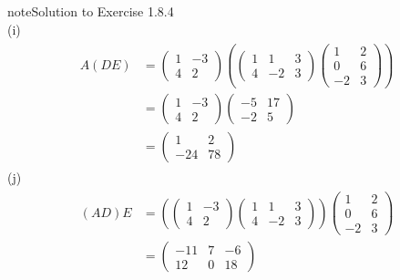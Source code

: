 \documentclass[letterpaper,10pt,english]{jupyterBook}
\begin{document}
\begin{sphinxadmonition}{note}{Solution to Exercise 1.8.4}
\begin{equation*}
\end{equation*}
\sphinxAtStartPar
(i)  
\begin{equation*}
\begin{split} \begin{align*}
    A(DE) &= \begin{pmatrix} 1 & -3 \\ 4 & 2 \end{pmatrix} \left(
    \begin{pmatrix} 1 & 1 & 3 \\ 4 & -2 & 3 \end{pmatrix} 
    \begin{pmatrix} 1 & 2 \\ 0 & 6 \\ -2 & 3 \end{pmatrix} \right) \\
    &= \begin{pmatrix} 1 & -3 \\ 4 & 2 \end{pmatrix}
    \begin{pmatrix} -5 & 17 \\ -2 & 5 \end{pmatrix} \\
    &= \begin{pmatrix} 1 & 2 \\ -24 & 78 \end{pmatrix}
\end{align*} \end{split}
\end{equation*}
\sphinxAtStartPar
(j)  
\begin{equation*}
\begin{split} \begin{align*}
    (AD)E &= \left(
    \begin{pmatrix} 1 & -3 \\ 4 & 2 \end{pmatrix}
    \begin{pmatrix} 1 & 1 & 3 \\ 4 & -2 & 3 \end{pmatrix}
    \right)
    \begin{pmatrix} 1 & 2 \\ 0 & 6 \\ -2 & 3 \end{pmatrix} \\
    &= \begin{pmatrix} -11 & 7 & -6 \\ 12 & 0 & 18 \end{pmatrix}

\end{align*}
\end{split}
\end{equation*}
\end{sphinxadmonition}
\end{document}
